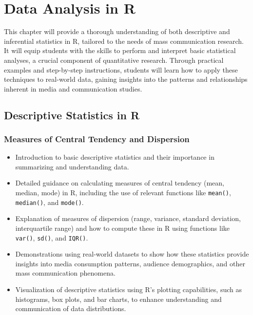 \documentclass[
]{book}
\begin{document}
\hypertarget{data-analysis-in-r}{%
\chapter*{Data Analysis in R}\label{data-analysis-in-r}}

This chapter will provide a thorough understanding of both descriptive and inferential statistics in R, tailored to the needs of mass communication research. It will equip students with the skills to perform and interpret basic statistical analyses, a crucial component of quantitative research. Through practical examples and step-by-step instructions, students will learn how to apply these techniques to real-world data, gaining insights into the patterns and relationships inherent in media and communication studies.

\hypertarget{descriptive-statistics-in-r}{%
\section*{Descriptive Statistics in R}\label{descriptive-statistics-in-r}}

\hypertarget{measures-of-central-tendency-and-dispersion}{%
\subsection*{Measures of Central Tendency and Dispersion}\label{measures-of-central-tendency-and-dispersion}}

\begin{itemize}
\item
  Introduction to basic descriptive statistics and their importance in summarizing and understanding data.
\item
  Detailed guidance on calculating measures of central tendency (mean, median, mode) in R, including the use of relevant functions like \texttt{mean()}, \texttt{median()}, and \texttt{mode()}.
\item
  Explanation of measures of dispersion (range, variance, standard deviation, interquartile range) and how to compute these in R using functions like \texttt{var()}, \texttt{sd()}, and \texttt{IQR()}.
\item
  Demonstrations using real-world datasets to show how these statistics provide insights into media consumption patterns, audience demographics, and other mass communication phenomena.
\item
  Visualization of descriptive statistics using R's plotting capabilities, such as histograms, box plots, and bar charts, to enhance understanding and communication of data distributions.
\end{itemize}
\end{document}
